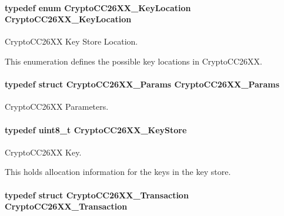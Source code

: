 \paragraph[{Crypto\-C\-C26\-X\-X\-\_\-\-Key\-Location}]{\setlength{\rightskip}{0pt plus 5cm}typedef enum {\bf Crypto\-C\-C26\-X\-X\-\_\-\-Key\-Location}  {\bf Crypto\-C\-C26\-X\-X\-\_\-\-Key\-Location}}\label{_crypto_c_c26_x_x_8h_a4e214e5283d16ac67e593c7c8a5bc058}


Crypto\-C\-C26\-X\-X Key Store Location. 

This enumeration defines the possible key locations in Crypto\-C\-C26\-X\-X. 
\paragraph[{Crypto\-C\-C26\-X\-X\-\_\-\-Params}]{\setlength{\rightskip}{0pt plus 5cm}typedef struct {\bf Crypto\-C\-C26\-X\-X\-\_\-\-Params}  {\bf Crypto\-C\-C26\-X\-X\-\_\-\-Params}}\label{_crypto_c_c26_x_x_8h_afd8b8a794d92fe38d4806238c3b6fef7}


Crypto\-C\-C26\-X\-X Parameters. 

\paragraph[{Crypto\-C\-C26\-X\-X\-\_\-\-Key\-Store}]{\setlength{\rightskip}{0pt plus 5cm}typedef uint8\-\_\-t {\bf Crypto\-C\-C26\-X\-X\-\_\-\-Key\-Store}}\label{_crypto_c_c26_x_x_8h_a30e647b6ad6b608b60990929200686e0}


Crypto\-C\-C26\-X\-X Key. 

This holds allocation information for the keys in the key store. 
\paragraph[{Crypto\-C\-C26\-X\-X\-\_\-\-Transaction}]{\setlength{\rightskip}{0pt plus 5cm}typedef struct {\bf Crypto\-C\-C26\-X\-X\-\_\-\-Transaction}  {\bf Crypto\-C\-C26\-X\-X\-\_\-\-Transaction}}\label{_crypto_c_c26_x_x_8h_a7d5a6e41436163786d2e01c0122a3de7}


